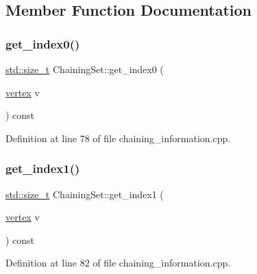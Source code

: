 \subsection{Member Function Documentation}
\mbox{\label{structChainingSet_a21c7efb9e25a51d54b023719b7e86ec4}} 
\subsubsection{\texorpdfstring{get\+\_\+index0()}{get\_index0()}}
{\footnotesize\ttfamily \hyperlink{tutorial__pact__2019_2Introduction_2sixth_2test_8c_a7c94ea6f8948649f8d181ae55911eeaf}{std\+::size\+\_\+t} Chaining\+Set\+::get\+\_\+index0 (\begin{DoxyParamCaption}\item[{\hyperlink{graph_8hpp_abefdcf0544e601805af44eca032cca14}{vertex}}]{v }\end{DoxyParamCaption}) const\hspace{0.3cm}{\ttfamily [inline]}}



Definition at line 78 of file chaining\+\_\+information.\+cpp.

\mbox{\label{structChainingSet_a92c3ae0bdea1642627a55b71f23be012}} 
\subsubsection{\texorpdfstring{get\+\_\+index1()}{get\_index1()}}
{\footnotesize\ttfamily \hyperlink{tutorial__pact__2019_2Introduction_2sixth_2test_8c_a7c94ea6f8948649f8d181ae55911eeaf}{std\+::size\+\_\+t} Chaining\+Set\+::get\+\_\+index1 (\begin{DoxyParamCaption}\item[{\hyperlink{graph_8hpp_abefdcf0544e601805af44eca032cca14}{vertex}}]{v }\end{DoxyParamCaption}) const\hspace{0.3cm}{\ttfamily [inline]}}



Definition at line 82 of file chaining\+\_\+information.\+cpp.



